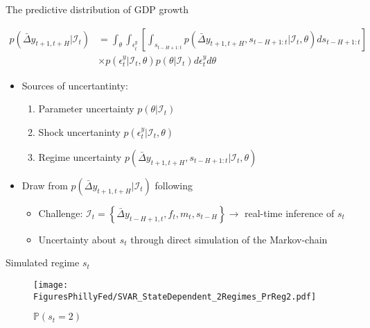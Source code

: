 \documentclass[xcolor=dvipsnames, xcolor=table, 10pt]{beamer}
\begin{document}
\begin{frame}{The predictive distribution of GDP growth}
\vspace*{-0.5in}

\begin{align*}
p\left(\bar{\Delta} y_{t+1,t+H}|\mathcal{I}_t\right) &= \int_\theta \int_{\epsilon^y_t} \left[ \int_{s_{t-H+1:t}} p(\bar{\Delta} y_{t+1,t+H}, s_{t-H+1:t} | \mathcal{I}_t,\theta) ds_{t-H+1:t} \right] \\ &  \times p(\epsilon^y_t|\mathcal{I}_t,\theta) p(\theta|\mathcal{I}_t) d \epsilon^y_t  d \theta
\end{align*}

\begin{itemize}
\item Sources of uncertantinty:
  \begin{enumerate}
    \medskip
    \item Parameter uncertainty $p(\theta|\mathcal{I}_t)$
    \medskip
    \item Shock uncertaninty $p(\epsilon^y_t|\mathcal{I}_t,\theta)$
    \medskip
    \item Regime uncertainty $p(\bar{\Delta} y_{t+1,t+H}, s_{t-H+1:t} | \mathcal{I}_t,\theta)$
  \end{enumerate}
\bigskip

\item Draw from $p\left(\bar{\Delta} y_{t+1,t+H}|\mathcal{I}_t\right)$ following \cite{DS2013Handbook}
\begin{itemize}
\medskip
\item Challenge: $\mathcal{I}_t=\left\{\bar{\Delta}y_{t-H+1,t},f_{t},m_{t},s_{t-H}\right\} \rightarrow$ real-time inference of $s_t$

\medskip
\item Uncertainty about $s_t$ through direct simulation of the Markov-chain
\end{itemize}
\end{itemize}
\end{frame}



\begin{frame}{Simulated regime $s_t$}
\medskip
\vspace*{-0.25cm}
\begin{figure}
\caption*{$\mathbb{P}(s_t=2)$}
     \texttt{[image: FiguresPhillyFed/SVAR\_StateDependent\_2Regimes\_PrReg2.pdf]}
\end{figure}

\end{frame}
\end{document}
